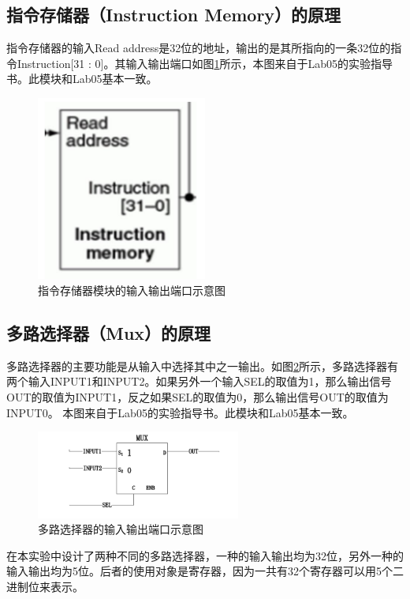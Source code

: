 \subsection{指令存储器（Instruction Memory）的原理}
指令存储器的输入Read address是32位的地址，输出的是其所指向的一条32位的指令Instruction[31 : 0]。其输入输出端口如图\ref{instructionmemory}所示，本图来自于Lab05的实验指导书。此模块和Lab05基本一致。
\begin{figure}[!h]
    \centering
    \includegraphics[width=0.5\textwidth]{./instmem.png}
    \caption{指令存储器模块的输入输出端口示意图}
    \label{instructionmemory}
\end{figure}

\subsection{多路选择器（Mux）的原理}
多路选择器的主要功能是从输入中选择其中之一输出。如图\ref{mux}所示，多路选择器有两个输入INPUT1和INPUT2。如果另外一个输入SEL的取值为1，那么输出信号OUT的取值为INPUT1，反之如果SEL的取值为0，那么输出信号OUT的取值为INPUT0。
本图来自于Lab05的实验指导书。此模块和Lab05基本一致。
\begin{figure}[!h]
    \centering
    \includegraphics[width=0.6\textwidth]{./mux.png}
    \caption{多路选择器的输入输出端口示意图}
    \label{mux}
\end{figure}

在本实验中设计了两种不同的多路选择器，一种的输入输出均为32位，另外一种的输入输出均为5位。后者的使用对象是寄存器，因为一共有32个寄存器可以用5个二进制位来表示。

